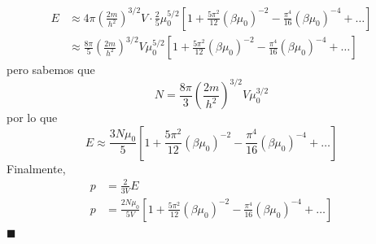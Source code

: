 \documentclass[]{article}
\numberwithin{equation}{section}
\newcommand{\0}{\textcolor{gray}{0}}
\newcommand{\qed}{\hfill\(\blacksquare\)}
\begin{document}
\begin{align*}
	E &\approx 4 \pi\left(\frac{2 m}{h^2}\right)^{3 / 2} V \cdot \frac{2}{5} \mu_0^{5/2} \left[1 + \frac{5 \pi^2}{12} (\beta \mu_0)^{-2} - \frac{\pi^4}{16} (\beta \mu_0)^{-4} + \ldots \right]\\
	&\approx \frac{8\pi}{5} \left(\frac{2 m}{h^2}\right)^{3 / 2} V \mu_0^{5/2} \left[1 + \frac{5 \pi^2}{12} (\beta \mu_0)^{-2} - \frac{\pi^4}{16} (\beta \mu_0)^{-4} + \ldots \right]
\end{align*}
pero sabemos que
\begin{equation}
	N = \frac{8\pi}{3}\left(\frac{2m}{h^2}\right)^{3/2}V\mu_0^{3/2}
\end{equation}
por lo que
\begin{equation}
	E \approx \frac{3 N \mu_0}{5} \left[1 + \frac{5 \pi^2}{12} (\beta \mu_0)^{-2} - \frac{\pi^4}{16} (\beta \mu_0)^{-4} + \ldots \right]
\end{equation}
Finalmente,
\begin{align}
	p &= \frac{2}{3V} E \nonumber\\
	p &= \frac{2 N \mu_0}{5 V} \left[1 + \frac{5 \pi^2}{12} (\beta \mu_0)^{-2} - \frac{\pi^4}{16} (\beta \mu_0)^{-4} + \ldots \right]
\end{align}
\qed

\end{document}
